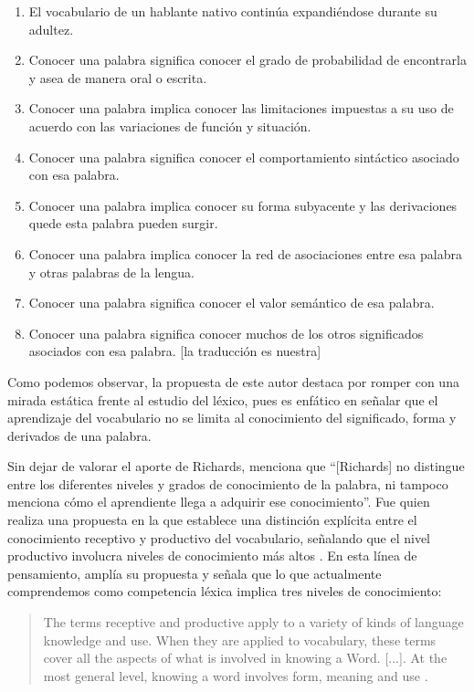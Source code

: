 \documentclass{textolivre-html}
\begin{document}
\begin{enumerate}
\item El vocabulario de un hablante nativo continúa expandiéndose durante su adultez.
\item Conocer una palabra significa conocer el grado de probabilidad de encontrarla y asea de manera oral o escrita.
\item Conocer una palabra implica conocer las limitaciones impuestas a su uso de acuerdo con las variaciones de función y situación.
\item Conocer una palabra significa conocer el comportamiento sintáctico asociado con esa palabra.
\item Conocer una palabra implica conocer su forma subyacente y las derivaciones quede esta palabra pueden surgir.
\item Conocer una  palabra implica conocer la red de  asociaciones entre  esa  palabra  y otras palabras de la lengua.
\item Conocer una palabra significa conocer el valor semántico de esa palabra.
\item Conocer una palabra significa conocer muchos de los otros significados asociados con esa palabra. [la traducción es nuestra]
\end{enumerate}

Como podemos observar, la propuesta de este autor destaca por romper con
una mirada estática frente al estudio del léxico, pues es enfático en señalar
que el aprendizaje del vocabulario no se limita al conocimiento del significado,
forma y derivados de una palabra.

Sin dejar de valorar el aporte de Richards, \textcite[p. 15]{arancibia} menciona
que “[Richards] no distingue entre los diferentes niveles y grados de
conocimiento de la palabra, ni tampoco menciona cómo el aprendiente llega a
adquirir ese conocimiento”. Fue \textcite{natio1990} quien realiza una propuesta en la
que establece una distinción explícita entre el conocimiento receptivo y
productivo del vocabulario, señalando que el nivel productivo involucra niveles
de conocimiento más altos \cite{Choudhury2015}. En esta línea de pensamiento,
\textcite{natio2001} amplía su propuesta y señala que lo que actualmente comprendemos
como competencia léxica implica tres niveles de conocimiento:

\begin{quote}
The terms receptive and productive apply to a variety of kinds of
language knowledge and use. When they are applied to vocabulary, these terms
cover all the aspects of what is involved in knowing a Word. [...]. At the most
general level, knowing a word involves form, meaning and use \cite[p. 40]{natio2001}.
\end{quote}
\end{document}
